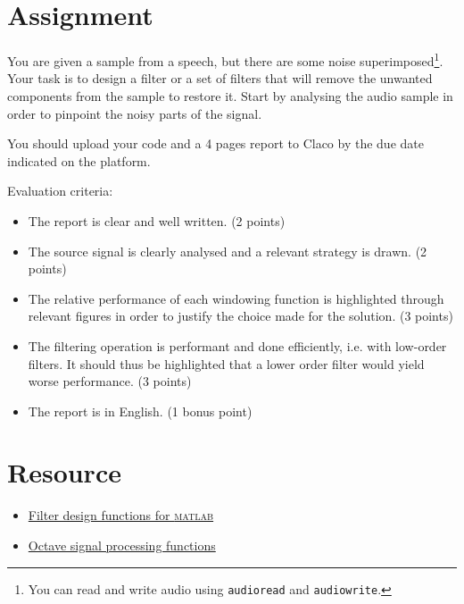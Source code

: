 \documentclass{../template/labo}
\newcommand{\matlab}{\textsc{matlab}}
\begin{document}
\section*{Assignment}
You are given a sample from a speech, but there are some noise superimposed\footnote{You can read and write audio using \texttt{audioread} and \texttt{audiowrite}.}.
Your task is to design a filter or a set of filters that will remove the unwanted components from the sample to restore it.
Start by analysing the audio sample in order to pinpoint the noisy parts of the signal.

You should upload your code and a 4 pages report to Claco by the due date indicated on the platform.

Evaluation criteria:
\begin{itemize}
  \item The report is clear and well written. (2 points)
  \item The source signal is clearly analysed and a relevant strategy is drawn. (2 points)
  \item The relative performance of each windowing function is highlighted through relevant figures in order to justify the choice made for the solution. (3 points)
  \item The filtering operation is performant and done efficiently, i.e. with low-order filters. It should thus be highlighted that a lower order filter would yield worse performance. (3 points)
  \item The report is in English. (1 bonus point)
\end{itemize}




\section*{Resource}
\begin{itemize}
	\item \href{https://www.mathworks.com/help/signal/referencelist.html?type=function&category=filter-design&s_tid=CRUX_topnav}{Filter design functions for \matlab}
  \item \href{https://octave.sourceforge.io/signal/overview.html}{Octave signal processing functions}
\end{itemize}
\end{document}
